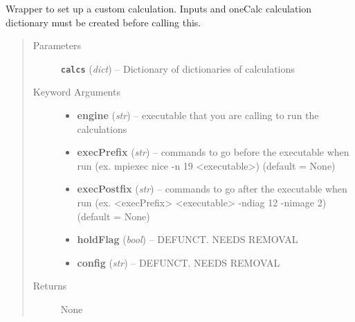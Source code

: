 \documentclass[letterpaper,10pt,english]{sphinxmanual}
\begin{document}
\begin{fulllineitems}
\label{run:run.__skeletonRun}
Wrapper to set up a custom calculation. Inputs and oneCalc calculation
dictionary must be created before calling this.
\begin{quote}\begin{description}
\item[{Parameters}] \leavevmode
\textbf{\texttt{calcs}} (\emph{dict}) -- Dictionary of dictionaries of calculations

\item[{Keyword Arguments}] \leavevmode\begin{itemize}
\item {} 
\textbf{engine} (\emph{str}) --
executable that you are calling to run the calculations

\item {} 
\textbf{execPrefix} (\emph{str}) --
commands to go before the executable when run
(ex. mpiexec nice -n 19 \textless{}executable\textgreater{}) (default = None)

\item {} 
\textbf{execPostfix} (\emph{str}) --
commands to go after the executable when run
(ex. \textless{}execPrefix\textgreater{} \textless{}executable\textgreater{} -ndiag 12 -nimage 2) (default = None)

\item {} 
\textbf{holdFlag} (\emph{bool}) --
DEFUNCT. NEEDS REMOVAL

\item {} 
\textbf{config} (\emph{str}) --
DEFUNCT. NEEDS REMOVAL

\end{itemize}

\item[{Returns}] \leavevmode
None

\end{description}\end{quote}

\end{fulllineitems}

\end{document}

